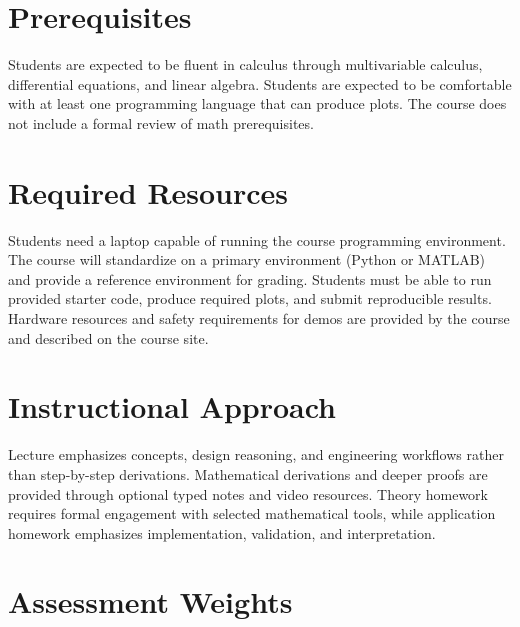 \documentclass[11pt,letterpaper]{article}
\begin{document}
\section*{Prerequisites}

Students are expected to be fluent in calculus through multivariable calculus, differential equations, and linear algebra. Students are expected to be comfortable with at least one programming language that can produce plots. The course does not include a formal review of math prerequisites.

\section*{Required Resources}

Students need a laptop capable of running the course programming environment. The course will standardize on a primary environment (Python or MATLAB) and provide a reference environment for grading. Students must be able to run provided starter code, produce required plots, and submit reproducible results. Hardware resources and safety requirements for demos are provided by the course and described on the course site.

\section*{Instructional Approach}

Lecture emphasizes concepts, design reasoning, and engineering workflows rather than step-by-step derivations. Mathematical derivations and deeper proofs are provided through optional typed notes and video resources. Theory homework requires formal engagement with selected mathematical tools, while application homework emphasizes implementation, validation, and interpretation.

\section*{Assessment Weights}
\end{document}
